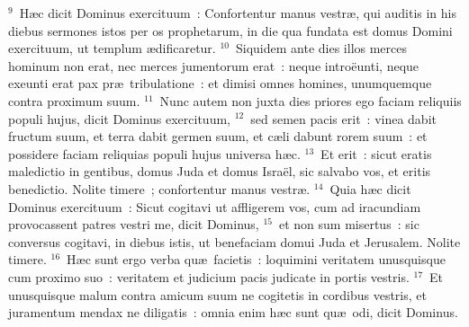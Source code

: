 ${}^{9}$~H\ae c dicit Dominus exercituum~: Confortentur manus vestr\ae , qui auditis in his diebus sermones istos per os prophetarum, in die qua fundata est domus Domini exercituum, ut templum \ae dificaretur.
${}^{10}$~Siquidem ante dies illos merces hominum non erat, nec merces jumentorum erat~: neque intro\"eunti, neque exeunti erat pax pr\ae\ tribulatione~: et dimisi omnes homines, unumquemque contra proximum suum.
${}^{11}$~Nunc autem non juxta dies priores ego faciam reliquiis populi hujus, dicit Dominus exercituum,
${}^{12}$~sed semen pacis erit~: vinea dabit fructum suum, et terra dabit germen suum, et c\ae li dabunt rorem suum~: et possidere faciam reliquias populi hujus universa h\ae c.
${}^{13}$~Et erit~: sicut eratis maledictio in gentibus, domus Juda et domus Isra\"el, sic salvabo vos, et eritis benedictio. Nolite timere~; confortentur manus vestr\ae .
${}^{14}$~Quia h\ae c dicit Dominus exercituum~: Sicut cogitavi ut affligerem vos, cum ad iracundiam provocassent patres vestri me, dicit Dominus,
${}^{15}$~et non sum misertus~: sic conversus cogitavi, in diebus istis, ut benefaciam domui Juda et Jerusalem. Nolite timere.
${}^{16}$~H\ae c sunt ergo verba qu\ae\ facietis~: loquimini veritatem unusquisque cum proximo suo~: veritatem et judicium pacis judicate in portis vestris.
${}^{17}$~Et unusquisque malum contra amicum suum ne cogitetis in cordibus vestris, et juramentum mendax ne diligatis~: omnia enim h\ae c sunt qu\ae\ odi, dicit Dominus.



